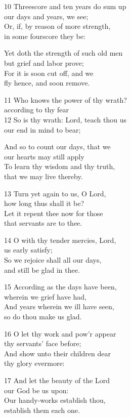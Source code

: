 10 Threescore and ten years do sum up\\
our days and years, we see;\\
Or, if, by reason of more strength,\\
in some fourscore they be:

Yet doth the strength of such old men\\
but grief and labor prove;\\
For it is soon cut off, and we\\
fly hence, and soon remove.

11 Who knows the power of thy wrath?\\
according to thy fear\\
12 So is thy wrath: Lord, teach thou us\\
our end in mind to bear;

And so to count our days, that we\\
our hearts may still apply\\
To learn thy wisdom and thy truth,\\
that we may live thereby.

13 Turn yet again to us, O Lord,\\
how long thus shall it be?\\
Let it repent thee now for those\\
that servants are to thee.

14 O with thy tender mercies, Lord,\\
us early satisfy;\\
So we rejoice shall all our days,\\
and still be glad in thee.

15 According as the days have been,\\
wherein we grief have had,\\
And years wherein we ill have seen,\\
so do thou make us glad.

16 O let thy work and pow’r appear\\
thy servants’ face before;\\
And show unto their children dear\\
thy glory evermore:

17 And let the beauty of the Lord\\
our God be us upon:\\
Our handy-works establish thou,\\
establish them each one.

\begin{center}
\quad{}\quad{}
\end{center}


